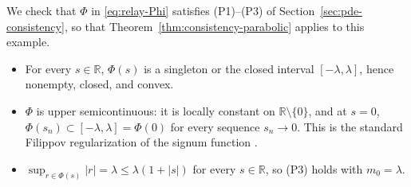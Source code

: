 \documentclass[11pt]{elsarticle}
\theoremstyle{definition}
\theoremstyle{remark}
\numberwithin{equation}{section}
\begin{document}
We check that $\Phi$ in \eqref{eq:relay-Phi} satisfies (P1)--(P3) of
Section~\ref{sec:pde-consistency}, so that Theorem~\ref{thm:consistency-parabolic}
applies to this example.
\begin{itemize}
	\item[(P1)] For every $s\in\mathbb{R}$, $\Phi(s)$ is a singleton or the
	closed interval $[-\lambda,\lambda]$, hence nonempty, closed, and convex.
	\item[(P2)] $\Phi$ is upper semicontinuous: it is locally constant on
	$\mathbb{R}\setminus\{0\}$, and at $s=0$, $\Phi(s_n)\subset[-\lambda,\lambda]=\Phi(0)$
	for every sequence $s_n\to0$. This is the standard Filippov
	regularization of the signum function \cite{Filippov1988}.
	\item[(P3)] $\sup_{r\in\Phi(s)}|r| = \lambda \le \lambda(1+|s|)$ for every
	$s\in\mathbb{R}$, so (P3) holds with $m_0=\lambda$.
\end{itemize}
\end{document}
